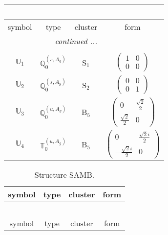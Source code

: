 \documentclass[fleqn,10pt,landscape]{article}
\begin{document}
\begin{itemize}
\begin{center}
\begin{longtable}{c|c|c|c}
\multicolumn{3}{l}{\tablename\ \thetable{}} \\
 \hline \hline
symbol & type & cluster & form \\ \hline \endhead

 \hline \hline
\multicolumn{3}{r}{\footnotesize\it continued ...} \\ \endfoot

 \hline \hline
\multicolumn{3}{r}{} \\ \endlastfoot

$ \mathbb{U}_{1} $ & $\mathbb{Q}_{0}^{(s,A_{g})}$ & S$_{1}$ & $\begin{pmatrix} 1 & 0 \\ 0 & 0 \end{pmatrix}$ \\ \hline
$ \mathbb{U}_{2} $ & $\mathbb{Q}_{0}^{(s,A_{g})}$ & S$_{2}$ & $\begin{pmatrix} 0 & 0 \\ 0 & 1 \end{pmatrix}$ \\ \hline
$ \mathbb{U}_{3} $ & $\mathbb{Q}_{0}^{(u,A_{g})}$ & B$_{5}$ & $\begin{pmatrix} 0 & \frac{\sqrt{2}}{2} \\ \frac{\sqrt{2}}{2} & 0 \end{pmatrix}$ \\
$ \mathbb{U}_{4} $ & $\mathbb{T}_{0}^{(u,A_{g})}$ & B$_{5}$ & $\begin{pmatrix} 0 & \frac{\sqrt{2} i}{2} \\ - \frac{\sqrt{2} i}{2} & 0 \end{pmatrix}$ \\
\end{longtable}
\end{center}
\begin{center}
\renewcommand{\arraystretch}{1.3}
\begin{longtable}{c|c|c|c}
\caption{Structure SAMB.}
 \\
 \hline \hline
symbol & type & cluster & form \\ \hline \endfirsthead

\multicolumn{3}{l}{\tablename\ \thetable{}} \\
 \hline \hline
symbol & type & cluster & form \\ \hline \endhead


\end{longtable}
\end{center}
\end{itemize}
\end{document}

